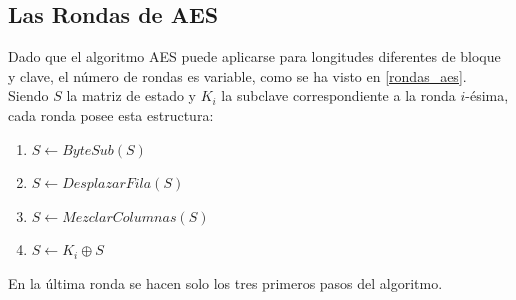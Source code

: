 \subsection{Las Rondas de AES}
Dado que el algoritmo AES puede aplicarse para longitudes diferentes de bloque y clave, el número de rondas es variable, como se ha visto en \ref{rondas_aes}.\\
Siendo $S$ la matriz de estado y $K_i$ la subclave correspondiente a la ronda $i$-ésima, cada ronda posee esta estructura:
\begin{enumerate}
	\item $S \leftarrow ByteSub(S)$
	\item $S \leftarrow DesplazarFila(S)$
	\item $S \leftarrow MezclarColumnas(S)$
	\item $S \leftarrow K_i \oplus S$
\end{enumerate}
En la última ronda se hacen solo los tres primeros pasos del algoritmo.

